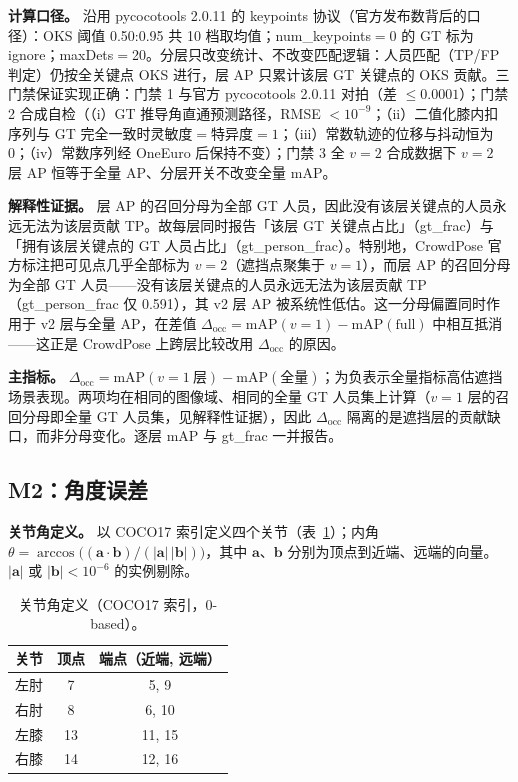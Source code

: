 \documentclass[10pt,conference]{IEEEtran}
\begin{document}
\textbf{计算口径。} 沿用 pycocotools 2.0.11 的 keypoints 协议（官方发布数背后的口径）：OKS 阈值 0.50:0.95 共 10 档取均值；num\_keypoints$=$0 的 GT 标为 ignore；maxDets$=$20。分层只改变统计、不改变匹配逻辑：人员匹配（TP/FP 判定）仍按全关键点 OKS 进行，层 AP 只累计该层 GT 关键点的 OKS 贡献。三门禁保证实现正确：门禁 1 与官方 pycocotools 2.0.11 对拍（差 $\le0.0001$）；门禁 2 合成自检（（i）GT 推导角直通预测路径，RMSE $<10^{-9}$；（ii）二值化膝内扣序列与 GT 完全一致时灵敏度$=$特异度$=1$；（iii）常数轨迹的位移与抖动恒为 0；（iv）常数序列经 OneEuro 后保持不变）；门禁 3 全 $v{=}2$ 合成数据下 $v{=}2$ 层 AP 恒等于全量 AP、分层开关不改变全量 mAP。

\textbf{解释性证据。} 层 AP 的召回分母为全部 GT 人员，因此没有该层关键点的人员永远无法为该层贡献 TP。故每层同时报告「该层 GT 关键点占比」（gt\_frac）与「拥有该层关键点的 GT 人员占比」（gt\_person\_frac）。特别地，CrowdPose 官方标注把可见点几乎全部标为 $v{=}2$（遮挡点聚集于 $v{=}1$），而层 AP 的召回分母为全部 GT 人员——没有该层关键点的人员永远无法为该层贡献 TP（gt\_person\_frac 仅 0.591），其 v2 层 AP 被系统性低估。这一分母偏置同时作用于 v2 层与全量 AP，在差值 $\Delta_{\mathrm{occ}}=\mathrm{mAP}(v{=}1)-\mathrm{mAP}(\mathrm{full})$ 中相互抵消——这正是 CrowdPose 上跨层比较改用 $\Delta_{\mathrm{occ}}$ 的原因。

\textbf{主指标。} $\Delta_{\mathrm{occ}}=\mathrm{mAP}(v{=}1\ \mathrm{层})-\mathrm{mAP}(\mathrm{全量})$；为负表示全量指标高估遮挡场景表现。两项均在相同的图像域、相同的全量 GT 人员集上计算（$v{=}1$ 层的召回分母即全量 GT 人员集，见解释性证据），因此 $\Delta_{\mathrm{occ}}$ 隔离的是遮挡层的贡献缺口，而非分母变化。逐层 mAP 与 gt\_frac 一并报告。

\subsection{M2：角度误差}

\textbf{关节角定义。} 以 COCO17 索引定义四个关节（表~\ref{tab:joints}）；内角 $\theta=\arccos\big((\mathbf{a}\cdot\mathbf{b})/(|\mathbf{a}|\,|\mathbf{b}|)\big)$，其中 $\mathbf{a}$、$\mathbf{b}$ 分别为顶点到近端、远端的向量。$|\mathbf{a}|$ 或 $|\mathbf{b}|<10^{-6}$ 的实例剔除。

\begin{table}[t]
\centering
\caption{关节角定义（COCO17 索引，0-based）。}
\label{tab:joints}
\renewcommand{\arraystretch}{1.15}
\begin{tabular}{lcc}
\toprule
\textbf{关节} & \textbf{顶点} & \textbf{端点（近端, 远端）} \\
\midrule
左肘 & 7 & 5, 9 \\
右肘 & 8 & 6, 10 \\
左膝 & 13 & 11, 15 \\
右膝 & 14 & 12, 16 \\
\bottomrule
\end{tabular}
\end{table}
\end{document}
